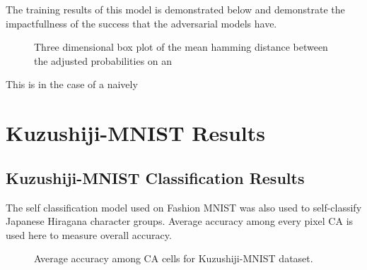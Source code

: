 \documentclass[conference]{IEEEtran}
\begin{document}
The training results of this model is demonstrated below and demonstrate the impactfullness of the success that the adversarial models have.

\begin{figure}[htbp]
\caption{Three dimensional box plot of the mean hamming distance between the adjusted probabilities on an }
\end{figure}

This is in the case of a naively

\section{Kuzushiji-MNIST Results}

\subsection{Kuzushiji-MNIST Classification Results}

The self classification model used on Fashion MNIST was also used to self-classify Japanese Hiragana character groups. Average accuracy among every pixel CA is used here to measure overall accuracy. 

\begin{figure}[htbp]
\caption{Average accuracy among CA cells for Kuzushiji-MNIST dataset.}
\label{kmnistavg}
\end{figure}
\end{document}
